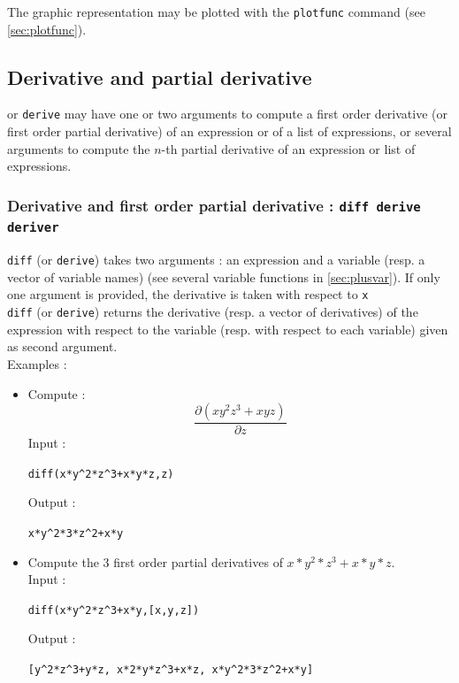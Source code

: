 \documentclass[a4paper,11pt]{book}
\begin{document}
The graphic representation may be plotted with the {\tt plotfunc} command 
(see \ref{sec:plotfunc}).

\subsection{Derivative and partial derivative}
 or {\tt derive} may have one or two arguments 
to compute a first order derivative (or first order partial
derivative) of an expression or of a list of expressions, 
or several arguments to compute 
the $n$-th partial derivative of an expression or list of expressions.

\subsubsection{Derivative and first order partial derivative : {\tt diff derive deriver}}
{\tt diff} (or {\tt derive}) takes two arguments : an expression and a variable
(resp. a vector of variable names) (see several variable functions in
 \ref{sec:plusvar}). If only one argument is provided, the derivative
is taken with respect to {\tt x}\\
{\tt diff} (or {\tt derive}) returns the derivative (resp. a vector of 
derivatives) of the expression with respect to the variable (resp. with respect 
to each variable) given as second argument.\\
Examples :
\begin{itemize}
\item Compute :
$$\frac {\partial (x y^2 z^3+x y z)}{\partial z}$$
Input :
\begin{center}{\tt  diff(x*y\verb|^|2*z\verb|^|3+x*y*z,z)}\end{center}
Output :
\begin{center}{\tt x*y\verb|^|2*3*z\verb|^|2+x*y}\end{center}
\item Compute the 3 first order partial derivatives of $x*y^2*z^3+x*y*z$.\\
Input :
\begin{center}{\tt  diff(x*y\verb|^|2*z\verb|^|3+x*y,[x,y,z])}\end{center}
Output :
\begin{center}{\tt [y\verb|^|2*z\verb|^|3+y*z, x*2*y*z\verb|^|3+x*z, x*y\verb|^|2*3*z\verb|^|2+x*y]}\end{center}
\end{itemize}
\end{document}
